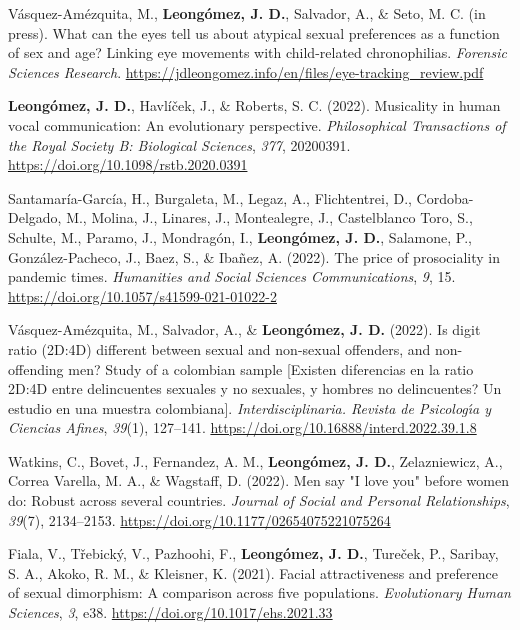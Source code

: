 \documentclass[11pt,a4paper,]{awesome-cv}
\begin{document}
\begingroup
\setlength{\parindent}{-0.5in}
\setlength{\leftskip}{0.5in}

\hypertarget{refs_journals}{}
\leavevmode{}%
Vásquez-Amézquita, M., \textbf{Leongómez, J. D.}, Salvador, A., \& Seto,
M. C. (in press). {What can the eyes tell us about atypical sexual
preferences as a function of sex and age? Linking eye movements with
child-related chronophilias}. \emph{Forensic Sciences Research}.
\url{https://jdleongomez.info/en/files/eye-tracking_review.pdf}

\leavevmode{}%
\textbf{Leongómez, J. D.}, Havlíček, J., \& Roberts, S. C. (2022).
Musicality in human vocal communication: {An} evolutionary perspective.
\emph{Philosophical Transactions of the Royal Society B: Biological
Sciences}, \emph{377}, 20200391.
\url{https://doi.org/10.1098/rstb.2020.0391}

\leavevmode{}%
Santamaría-García, H., Burgaleta, M., Legaz, A., Flichtentrei, D.,
Cordoba-Delgado, M., Molina, J., Linares, J., Montealegre, J.,
Castelblanco Toro, S., Schulte, M., Paramo, J., Mondragón, I.,
\textbf{Leongómez, J. D.}, Salamone, P., González-Pacheco, J., Baez, S.,
\& Ibañez, A. (2022). The price of prosociality in pandemic times.
\emph{Humanities and Social Sciences Communications}, \emph{9}, 15.
\url{https://doi.org/10.1057/s41599-021-01022-2}

\leavevmode{}%
Vásquez-Amézquita, M., Salvador, A., \& \textbf{Leongómez, J. D.}
(2022). Is digit ratio (2D:4D) different between sexual and non-sexual
offenders, and non-offending men? Study of a colombian sample
{{[}Existen diferencias en la ratio 2D:4D entre delincuentes sexuales y
no sexuales, y hombres no delincuentes? Un estudio en una muestra
colombiana{]}}. \emph{Interdisciplinaria. Revista de Psicolog{ı́}a y
Ciencias Afines}, \emph{39}(1), 127--141.
\url{https://doi.org/10.16888/interd.2022.39.1.8}

\leavevmode{}%
Watkins, C., Bovet, J., Fernandez, A. M., \textbf{Leongómez, J. D.},
Zelazniewicz, A., Correa Varella, M. A., \& Wagstaff, D. (2022). {Men
say "I love you" before women do: Robust across several countries}.
\emph{Journal of Social and Personal Relationships}, \emph{39}(7),
2134--2153. \url{https://doi.org/10.1177/02654075221075264}

\leavevmode{}%
Fiala, V., Třebický, V., Pazhoohi, F., \textbf{Leongómez, J. D.},
Tureček, P., Saribay, S. A., Akoko, R. M., \& Kleisner, K. (2021).
Facial attractiveness and preference of sexual dimorphism: A comparison
across five populations. \emph{Evolutionary Human Sciences}, \emph{3},
e38. \url{https://doi.org/10.1017/ehs.2021.33}
\end{document}
